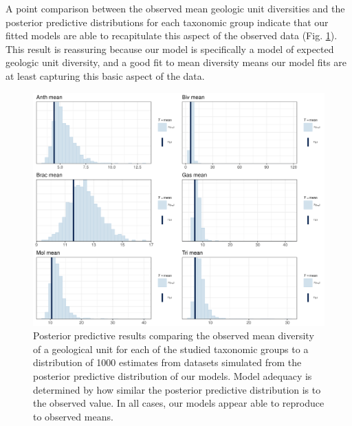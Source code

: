 \documentclass[12pt,letterpaper]{article}
\begin{document}
A point comparison between the observed mean geologic unit diversities and the posterior predictive distributions for each taxonomic group indicate that our fitted models are able to recapitulate this aspect of the observed data (Fig. \ref{fig:ppc_mean}). This result is reassuring because our model is specifically a model of expected geologic unit diversity, and a good fit to mean diversity means our model fits are at least capturing this basic aspect of the data.
\begin{figure}[ht]
  \centering
  \includegraphics[width=\textwidth,height=0.5\textheight,keepaspectratio=true]{figure/ppc_mean_diversity}
  \caption{Posterior predictive results comparing the observed mean diversity of a geological unit for each of the studied taxonomic groups to a distribution of 1000 estimates from datasets simulated from the posterior predictive distribution of our models. Model adequacy is determined by how similar the posterior predictive distribution is to the observed value. In all cases, our models appear able to reproduce to observed means.}
  \label{fig:ppc_mean}
\end{figure}
\end{document}
